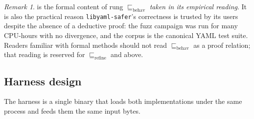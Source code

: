 \documentclass[12pt]{article}
\theoremstyle{definition}
\theoremstyle{remark}
\newtheorem{remark}[theorem]{Remark}
\begin{document}
\begin{remark}
 is the formal content of rung
$\sqsubseteq_{\mathrm{behav}}$ \emph{taken in its empirical reading}.
It is also the practical reason \texttt{libyaml-safer}'s correctness
is trusted by its users despite the absence of a deductive proof: the
fuzz campaign was run for many CPU-hours with no divergence, and the
corpus is the canonical YAML test suite. Readers familiar with formal
methods should not read $\sqsubseteq_{\mathrm{behav}}$ as a proof
relation; that reading is reserved for $\sqsubseteq_{\mathrm{refine}}$
and above.
\end{remark}

\subsection{Harness design}

The harness is a single binary that loads both implementations under
the same process and feeds them the same input bytes.
\end{document}
